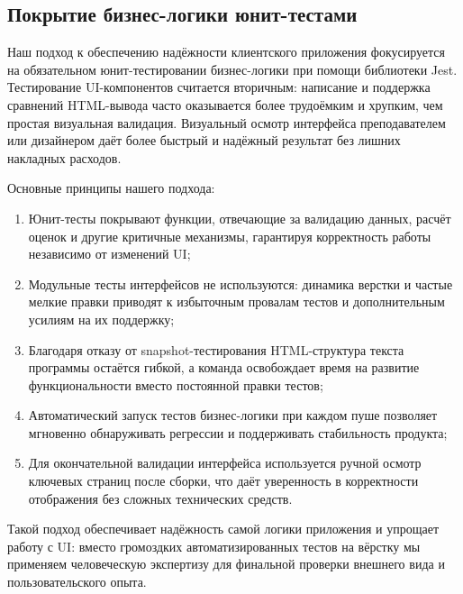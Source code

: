 \subsection{Покрытие бизнес-логики юнит-тестами}

Наш подход к обеспечению надёжности клиентского приложения фокусируется на обязательном юнит-тестировании бизнес-логики при помощи библиотеки Jest. Тестирование UI-компонентов считается вторичным: написание и поддержка сравнений HTML-вывода часто оказывается более трудоёмким и хрупким, чем простая визуальная валидация. Визуальный осмотр интерфейса преподавателем или дизайнером даёт более быстрый и надёжный результат без лишних накладных расходов.

Основные принципы нашего подхода:
\begin{enumerate}
  \item Юнит-тесты покрывают функции, отвечающие за валидацию данных, расчёт оценок и другие критичные механизмы, гарантируя корректность работы независимо от изменений UI;
  \item Модульные тесты интерфейсов не используются: динамика верстки и частые мелкие правки приводят к избыточным провалам тестов и дополнительным усилиям на их поддержку;
  \item Благодаря отказу от snapshot-тестирования HTML-структура текста программы остаётся гибкой, а команда освобождает время на развитие функциональности вместо постоянной правки тестов;
  \item Автоматический запуск тестов бизнес-логики при каждом пуше позволяет мгновенно обнаруживать регрессии и поддерживать стабильность продукта;
  \item Для окончательной валидации интерфейса используется ручной осмотр ключевых страниц после сборки, что даёт уверенность в корректности отображения без сложных технических средств.
\end{enumerate}

Такой подход обеспечивает надёжность самой логики приложения и упрощает работу с UI: вместо громоздких автоматизированных тестов на вёрстку мы применяем человеческую экспертизу для финальной проверки внешнего вида и пользовательского опыта.
